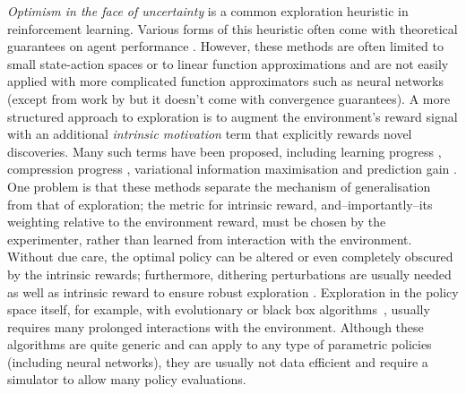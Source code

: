 \documentclass{article}
\begin{document}
\textit{Optimism in the face of uncertainty} is a common exploration heuristic in reinforcement learning.
Various forms of this heuristic often come with theoretical guarantees on agent performance \citep{azar2017minimax,lattimore2013sample,jaksch2010near,auer2007logarithmic,kearns2002near}.
However, these methods are often limited to small state-action spaces or to linear function approximations and are not easily applied with more complicated function approximators such as neural networks (except from work by \citep{geist2010kalman,geist2010managing} but it doesn't come with convergence guarantees). A more structured approach to exploration is to augment the environment's reward signal with an additional \textit{intrinsic motivation} term \citep{singh2004intrinsically} that explicitly rewards novel discoveries.
Many such terms have been proposed, including learning progress \citep{oudeyer07intrinsic}, compression progress \citep{schmidhuber2010formal}, variational information maximisation \citep{houthooft2016vime} and prediction gain \citep{bellemare2016unifying}.
One problem is that these methods separate the mechanism of generalisation from that of exploration; the metric for intrinsic reward, and--importantly--its weighting relative to the environment reward, must be chosen by the experimenter, rather than learned from interaction with the environment.
Without due care, the optimal policy can be altered or even completely obscured by the intrinsic rewards; furthermore, dithering perturbations are usually needed as well as intrinsic reward to ensure robust exploration \citep{ostrovski2017count}. 
Exploration in the policy space itself, for example, with evolutionary or black box  algorithms~\citep{moriarty1999evolutionary,fix2012monte,2017arXiv170303864S}, usually requires many prolonged interactions with the environment. Although these algorithms are quite generic and can apply to any type of parametric policies (including neural networks), they are usually not data efficient and require a simulator to allow many policy evaluations.
\end{document}
